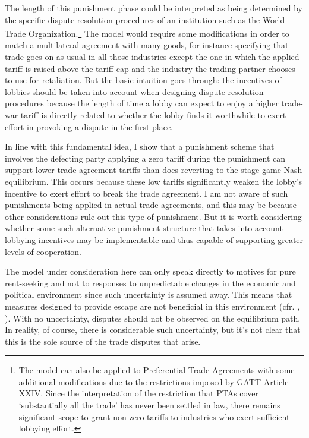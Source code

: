 \documentclass[authoryear, review]{elsarticle}
\begin{document}
The length of this punishment phase could be interpreted as being determined by the specific dispute resolution procedures of an institution such as the World Trade Organization.\footnote{The model can also be applied to Preferential Trade Agreements with some additional modifications due to the restrictions imposed by GATT Article XXIV. Since the interpretation of the restriction that PTAs cover `substantially all the trade' has never been settled in law, there remains significant scope to grant non-zero tariffs to industries who exert sufficient lobbying effort.} The model would require some modifications in order to match a multilateral agreement with many goods, for instance specifying that trade goes on as usual in all those industries except the one in which the applied tariff is raised above the tariff cap and the industry the trading partner chooses to use for retaliation. But the basic intuition goes through: the incentives of lobbies should be taken into account when designing dispute resolution procedures because the length of time a lobby can expect to enjoy a higher trade-war tariff is directly related to whether the lobby finds it worthwhile to exert effort in provoking a dispute in the first place. 

In line with this fundamental idea, I show that a punishment scheme that involves the defecting party applying a zero tariff during the punishment can support lower trade agreement tariffs than does reverting to the stage-game Nash equilibrium. This occurs because these low tariffs significantly weaken the lobby's incentive to exert effort to break the trade agreement. I am not aware of such punishments being applied in actual trade agreements, and this may be because other considerations rule out this type of punishment. But it is worth considering whether some such alternative punishment structure that takes into account lobbying incentives may be implementable and thus capable of supporting greater levels of cooperation.

The model under consideration here can only speak directly to motives for pure rent-seeking and not to responses to unpredictable changes in the economic and political environment since such uncertainty is assumed away. This means that measures designed to provide escape are not beneficial in this environment (cfr. \citet{bs2005}, \citet{buzard2014}). With no uncertainty, disputes should not be observed on the equilibrium path. In reality, of course, there is considerable such uncertainty, but it's not clear that this is the sole source of the trade disputes that arise.
\end{document}
